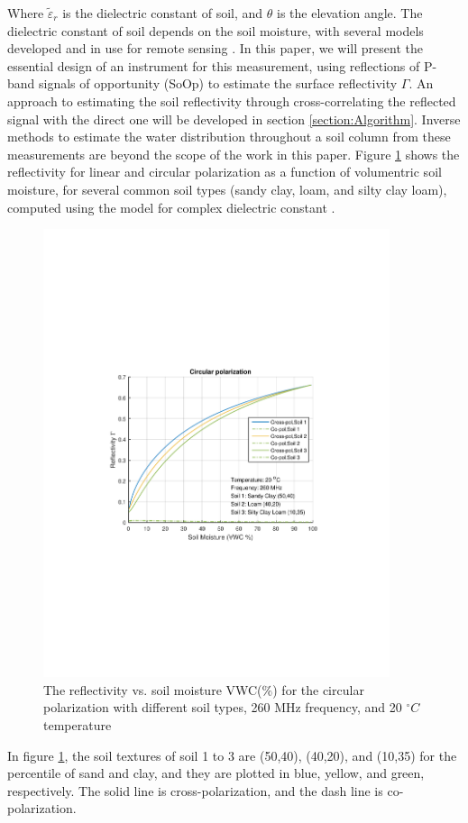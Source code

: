 \documentclass[draftcls,onecolumn]{IEEEtran}  %
\begin{document}
Where $\tilde{ \varepsilon }_r$ is the dielectric constant of soil, and  $\theta$ is the elevation angle. The dielectric constant of soil depends on the soil moisture, with several models developed and in use for remote sensing \cite{Wang:2009}. In this paper, we will present the essential design of an instrument for this measurement, using reflections of P-band signals of opportunity (SoOp) to estimate the surface reflectivity $\Gamma$. 
An approach to estimating the soil reflectivity through cross-correlating the reflected signal with the direct one will be developed in section \ref{section:Algorithm}.  Inverse methods to estimate the water distribution throughout a soil column from these measurements are beyond the scope of the work in this paper.  Figure \ref{fig:reflectivity} shows the reflectivity for linear and circular polarization as a function of volumentric soil moisture, for several common soil types (sandy clay, loam, and silty clay loam), computed using the model for complex dielectric constant  \cite{Peplinski:1995} \cite{Peplinski_correct:1995}.   
\begin{figure}[t!]
	\centering
	\includegraphics[width=4in]{pdf/gamma_vs_mv3.pdf}
	\caption{The reflectivity vs. soil moisture VWC($\%$) for the circular polarization with different soil types, 260 MHz frequency, and 20 $^\circ C$ temperature}
	\centering
	\label{fig:reflectivity}
\end{figure}
In figure \ref{fig:reflectivity}, the soil textures  of soil 1 to 3 are  (50,40), (40,20), and (10,35) for the percentile of sand and clay, and they are plotted in blue, yellow, and green, respectively. The solid line is cross-polarization, and the dash line is co-polarization.
\end{document}
